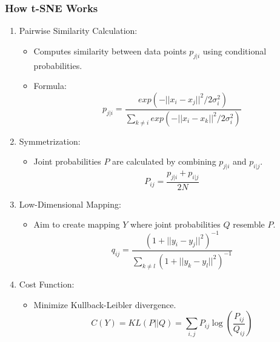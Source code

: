 \documentclass[aspectratio=169]{beamer}
\begin{document}
\begin{frame}[fragile]
    \frametitle{How t-SNE Works}
    \begin{enumerate}
        \item Pairwise Similarity Calculation:
        \begin{itemize}
            \item Computes similarity between data points \( p_{j|i} \) using conditional probabilities.
            \item Formula: 
            \begin{equation}
                p_{j|i} = \frac{exp(-||x_i - x_j||^2 / 2\sigma_i^2)}{\sum_{k \neq i} exp(-||x_i - x_k||^2 / 2\sigma_i^2)}
            \end{equation}
        \end{itemize}
        
        \item Symmetrization:
        \begin{itemize}
            \item Joint probabilities \( P \) are calculated by combining \( p_{j|i} \) and \( p_{i|j} \).
            \begin{equation}
                P_{ij} = \frac{p_{j|i} + p_{i|j}}{2N}
            \end{equation}
        \end{itemize}

        \item Low-Dimensional Mapping:
        \begin{itemize}
            \item Aim to create mapping \( Y \) where joint probabilities \( Q \) resemble \( P \).
            \begin{equation}
                q_{ij} = \frac{(1 + ||y_i - y_j||^2)^{-1}}{\sum_{k \neq l} (1 + ||y_k - y_l||^2)^{-1}}
            \end{equation}
        \end{itemize}

        \item Cost Function:
        \begin{itemize}
            \item Minimize Kullback-Leibler divergence.
            \begin{equation}
                C(Y) = KL(P || Q) = \sum_{i,j} P_{ij} \log \left( \frac{P_{ij}}{Q_{ij}} \right)
            \end{equation}
        \end{itemize}
    \end{enumerate}
\end{frame}
\end{document}
